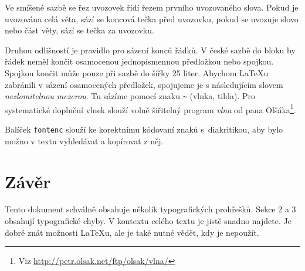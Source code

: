 \documentclass[10pt, twocolumn]{article}    %
\begin{document}
        Ve smíšené sazbě se řez uvozovek řídí řezem prvního uvozovaného slova.
        Pokud je uvozována celá věta, sází se koncová tečka před uvozovku, pokud se uvozuje slovo nebo část věty, sází se tečka za uvozovku.

        Druhou odlišností je pravidlo pro sázení konců řádků.
        V české sazbě do bloku by řádek neměl končit osamocenou jednopísmennou předložkou nebo spojkou.
        Spojkou  končit může pouze při sazbě do šířky 25 liter.
        Abychom \LaTeX u zabránili v sázení osamocených předložek, spojujeme je s následujícím slovem \emph{nezlomitelnou mezerou}.
        Tu sázíme pomocí znaku \verb|~| (vlnka, tilda).
        Pro systematické doplnění vlnek slouží volně šiřitelný program \emph{vlna} od pana Olšáka\footnote{Viz \url{http://petr.olsak.net/ftp/olsak/vlna/}}.

        Balíček \texttt{fontenc} slouží ke korektnímu kódovaní znaků s~diakritikou, aby bylo možno v textu vyhledávat a kopírovat z něj.
        
    \section{Závěr}
        Tento dokument schválně obsahuje několik typografických prohřešků.
        Sekce 2 a 3 obsahují typografické chyby.
        V kontextu celého textu je jistě snadno najdete.
        Je dobré znát možnosti \LaTeX u, ale je také nutné vědět, kdy je nepoužít.
\end{document}

